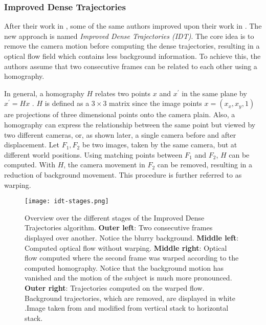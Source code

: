 \subsubsection{Improved Dense Trajectories}
\label{sec:improved-dense-trajectories}
After their work in \cite{wang_dense_2013}, some of the same authors improved upon their work in \cite{wang_action_2013}.
The new approach is named \textit{Improved Dense Trajectories (IDT)}.
The core idea is to remove the camera motion before computing the dense trajectories, resulting in a optical flow field which contains less background information.
To achieve this, the authors assume that two consecutive frames can be related to each other using a homography.

In general, a homography $H$ relates two points $x$ and $x^\prime$ in the same plane by $x^\prime = Hx$ \cite{vincent_detecting_2001}.
$H$ is defined as a $3 \times 3$ matrix since the image points $x = (x_x, x_y, 1)$ are projections of three dimensional points onto the camera plain.
Also, a homography can express the relationship between the same point but viewed by two different cameras, or, as shown later, a single camera before and after displacement.
Let $F_1, F_2$ be two images, taken by the same camera, but at different world positions.
Using matching points between $F_1$ and $F_2$, $H$ can be computed.
With $H$, the camera movement in $F_2$ can be removed, resulting in a reduction of background movement.
This procedure is further referred to as warping.

\begin{figure}[htb!]
    \centering
    \texttt{[image: idt-stages.png]}
    \caption{Overview over the different stages of the Improved Dense Trajectories algorithm. \textbf{Outer left}: Two consecutive frames displayed over another. Notice the blurry background. \textbf{Middle left}: Computed optical flow without warping. \textbf{Middle right}: Optical flow computed where the second frame was warped according to the computed homography. Notice that the background motion has vanished and the motion of the subject is much more pronounced. \textbf{Outer right}: Trajectories computed on the warped flow. Background trajectories, which are removed, are displayed in white .Image taken from \cite{wang_action_2013} and modified from vertical stack to horizontal stack. }
    \label{fig:idt-stages}
\end{figure}

